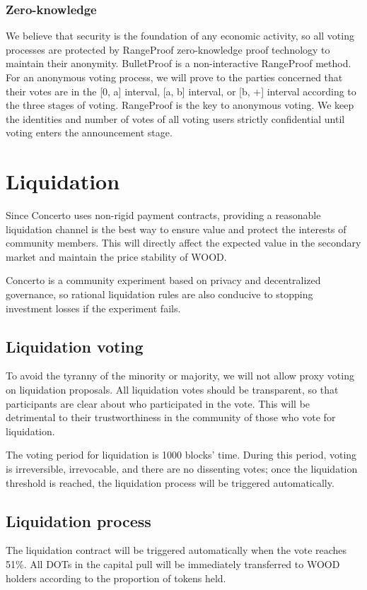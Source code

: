 \documentclass[UTF8]{article}
\begin{document}
\begin{multicols}{2}
\subsubsection{Zero-knowledge}

We believe that security is the foundation of any economic activity, so all voting processes are protected by RangeProof zero-knowledge proof technology to maintain their anonymity. BulletProof is a non-interactive RangeProof method. For an anonymous voting process, we will prove to the parties concerned that their votes are in the [0, a] interval, [a, b] interval, or [b, +] interval according to the three stages of voting. RangeProof is the key to anonymous voting. We keep the identities and number of votes of all voting users strictly confidential until voting enters the announcement stage.



\section{Liquidation}

Since Concerto uses non-rigid payment contracts, providing a reasonable liquidation channel is the best way to ensure value and protect the interests of community members. This will directly affect the expected value in the secondary market and maintain the price stability of WOOD.

Concerto is a community experiment based on privacy and decentralized governance, so rational liquidation rules are also conducive to stopping investment losses if the experiment fails.

\subsection{Liquidation voting}
To avoid the tyranny of the minority or majority, we will not allow proxy voting on liquidation proposals. All liquidation votes should be transparent, so that participants are clear about who participated in the vote. This will be detrimental to their trustworthiness in the community of those who vote for liquidation.

The voting period for liquidation is 1000 blocks’ time. During this period, voting is irreversible, irrevocable, and there are no dissenting votes; once the liquidation threshold is reached, the liquidation process will be triggered automatically.

\subsection{Liquidation process}
The liquidation contract will be triggered automatically when the vote reaches 51\%. All DOTs in the capital pull will be immediately transferred to WOOD holders according to the proportion of tokens held.


\end{multicols}
\end{document}
